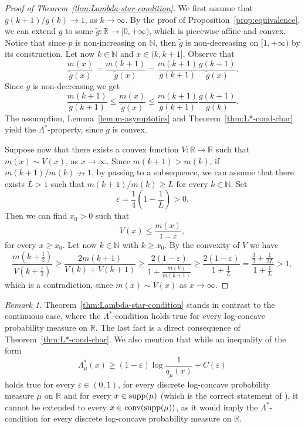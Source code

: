 \documentclass[11pt,a4paper]{article} %
\theoremstyle{definition}
\theoremstyle{remark}
\newtheorem{remark}[theorem]{Remark}
\newcommand{\conv}{\mathrm{conv}}
\newcommand{\1}{\mathds{1}}
\begin{document}
\begin{proof}[Proof of Theorem~\ref{thm:Lambda-star-condition}]
We first assume that $g(k+1)/g(k) \to 1$, as $k \to \infty$. By the proof of Proposition~\ref{prop:equivalence}, we can extend $g$ to some $\tilde{g}: \mathbb{R} \to [0,+\infty)$, which is piecewise affine and convex. Notice that since $p$ is non-increasing on $\mathbb{N}$, then $\tilde{g}$ is non-decreasing on $[1,+\infty)$ by its construction. Let now $k \in \mathbb{N}$ and $x \in (k,k+1]$. Observe that $$\frac{m(x)}{\tilde{g}(x)}=\frac{m(k+1)}{\tilde{g}(x)}=\frac{m(k+1)}{g(k+1)}\frac{g(k+1)}{\tilde{g}(x)}.$$ Since $\tilde{g}$ is non-decreasing we get $$\frac{m(k+1)}{g(k+1)} \leq \frac{m(x)}{\tilde{g}(x)}\leq \frac{m(k+1)}{g(k+1)}{\frac{g(k+1)}{g(k)}}.$$ The assumption, Lemma~\ref{lem:m-asymptotics} and Theorem~\ref{thm:L*-cond-char} yield the $\Lambda^\ast$-property, since $\tilde{g}$ is convex.

Suppose now that there exists a convex function $V:\mathbb{R} \to \mathbb{R}$ such that $m(x) \sim V(x)$, as $x \to \infty$. Since $m(k+1)>m(k)$, if $m(k+1)/m(k) \nrightarrow 1$, by passing to a subsequence, we can assume that there exists $L>1$ such that $m(k+1)/m(k) \geq L$ for every $k \in \mathbb{N}$. Set $$\varepsilon =\frac{1}{4}\left(1-\frac{1}{L}\right)>0.$$ Then we can find $x_0>0$ such that $$V(x) \leq \frac{m(x)}{1-\varepsilon},$$ for every $x \geq x_0$. Let now $k \in \mathbb{N}$ with $k \geq x_0$. By the convexity of $V$ we have $$\frac{m\left(k+\frac{1}{2}\right)}{V\left(k+\frac{1}{2}\right)} \geq \frac{2m(k+1)}{V(k)+V(k+1)} \geq \frac{2(1-\varepsilon)}{1+\frac{m(k)}{m(k+1)}} \geq \frac{2(1-\varepsilon)}{1+\frac{1}{L}}=\frac{\frac{3}{2}+\frac{1}{2L}}{1+\frac{1}{L}}>1,$$ which is a contradiction, since $m(x) \sim V(x)$ as $x \to \infty$.
\end{proof}

\begin{remark}
    Theorem~\ref{thm:Lambda-star-condition} stands in contrast to the continuous case, where the $\Lambda^\ast$-condition holds true for every log-concave probability measure on $\mathbb{R}$. The last fact is a direct consequence of Theorem~\ref{thm:L*-cond-char}. We also mention that while an inequality of the form $$\Lambda_{\mu}^\ast(x) \geq (1-\varepsilon) \log\frac{1}{q_{\mu}(x)}+C(\varepsilon)$$  holds true for every $\varepsilon \in (0,1)$, for every discrete log-concave probability measure $\mu$ on $\mathbb{R}$ and for every $x \in {\rm supp}(\mu)$ (which is the correct statement of \cite[Theorem 3.4]{BC}), it cannot be extended to every $x \in \conv({\rm supp}(\mu))$, as it would imply the $\Lambda^\ast$-condition for every discrete log-concave probability measure on $\mathbb{R}$.
\end{remark}
\end{document}
